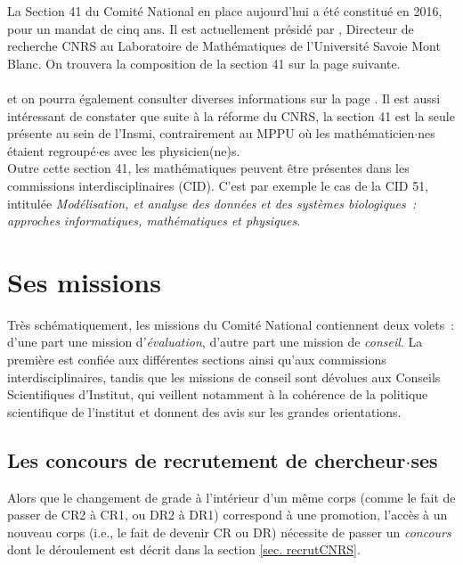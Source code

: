 La Section 41 du Comit\'e National en place aujourd'hui a \'et\'e constitu\'e en
2016, pour un mandat de cinq ans. Il est actuellement pr\'esid\'e par
, Directeur de recherche CNRS au Laboratoire de Math\'ematiques
de l'Universit\'e Savoie Mont Blanc.
On trouvera la composition de la section 41 sur la page suivante. \\
\\
et on pourra \'egalement consulter diverses informations sur la page .
Il est aussi int\'eressant de constater que suite \`a la r\'eforme du CNRS, la section 41 est la seule
pr\'esente au sein de l'Insmi, contrairement  au MPPU  o\`u les math\'ematicien$\cdot$nes \'etaient regroup\'e$\cdot$es
avec les physicien(ne)s. \\

Outre cette section 41, les math\'ematiques peuvent \^etre pr\'esentes
dans les commissions interdisciplinaires (CID). C'est par exemple le cas de la CID 51, intitul\'ee {\it  Mod\'elisation, et analyse des donn\'ees et des syst\`emes biologiques~: approches informatiques, math\'ematiques et physiques}.


\section{Ses missions}


Tr\`es sch\'ematiquement,
les missions du Comit\'e National contiennent deux volets~: d'une part
une mission d'{\em \'evaluation}, d'autre part une mission de {\em conseil}.
La premi\`ere est confi\'ee aux diff\'erentes sections ainsi qu'aux commissions interdisciplinaires, tandis que les missions de conseil sont d\'evolues aux Conseils Scientifiques d'Institut, qui veillent
notamment \`a la coh\'erence de la politique scientifique de l'institut et donnent des avis sur les grandes orientations.


\subsection{Les concours de recrutement de chercheur$\cdot$ses}
\label{sec. conccnrs}

Alors que le changement de grade \`a l'int\'erieur d'un m\^eme corps (comme le fait de passer de CR2 \`a CR1,
ou DR2 \`a DR1) correspond \`a une promotion, l'acc\`es \`a un nouveau corps (i.e., le fait de devenir CR ou DR)
n\'ecessite de passer un {\em concours} dont le d\'eroulement est d\'ecrit dans la section \ref{sec. recrutCNRS}. \\

